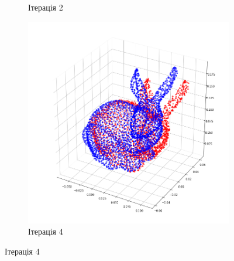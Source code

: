 \begin{figure}[h]
\begin{subfigure}[b]{0.3\textwidth}
      \caption{Ітерація 2}
  \end{subfigure}
  \begin{subfigure}[b]{0.3\textwidth}
      \includegraphics[width=\textwidth]{images/bunny_4}
      \caption{Ітерація 4}
  \end{subfigure}


\end{figure}
